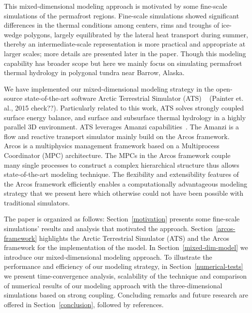 \documentclass[review]{elsarticle}
\begin{document}
This mixed-dimensional modeling approach is motivated by some fine-scale simulations of the permafrost regions. Fine-scale simulations showed significant differences in the thermal conditions among centers, rims and troughs of ice-wedge polygons, largely equilibrated by the lateral heat transport during summer, thereby an intermediate-scale representation is more practical and appropriate at larger scales; more details are presented later in the paper. Though this modeling capability has broader scope but here we mainly focus on simulating permafrost thermal hydrology in polygonal tundra near Barrow, Alaska. 

We have implemented our mixed-dimensional modeling strategy in the open-source state-of-the-art software Arctic Terrestrial Simulator (ATS) 
~\cite{ecoon2016managing, spainter2016integrated} (Painter et. al., 2015 check??).  Particularly related to this work, ATS solves strongly coupled surface energy balance, and surface and subsurface thermal hydrology in a highly parallel 3D environment. ATS leverages Amanzi capabilities~\cite{moulton2012high}. The Amanzi is a flow and reactive transport simulator mainly build on the Arcos framework. Arcos is a multiphysics management framework based on a Multiprocess Coordinator (MPC) architecture. The MPCs in the Arcos framework couple many single processes to construct a complex hierarchical structure thus allows state-of-the-art modeling technique. The flexibility and extensibility features of the Arcos framework efficiently enables a computationally advantageous modeling strategy that we present here which otherwise could not have been possible with traditional simulators.

The paper is organized as follows: Section~\ref{motivation} presents some fine-scale simulations' results and analysis that motivated the approach. Section~\ref{arcos-framework} highlights the Arctic Terrestrial Simulator (ATS) and the Arcos framework for the implementation of the model. In Section~\ref{mixed-dim-model} we introduce our mixed-dimensional modeling approach. To illustrate the performance and efficiency of our modeling strategy, in Section~\ref{numerical-tests} we present time-convergence analysis, scalability of the technique and comparison of numerical results of our modeling approach with the three-dimensional simulations based on strong coupling. Concluding remarks and future research are offered in Section~\ref{conclusion}, followed by references.

\end{document}
